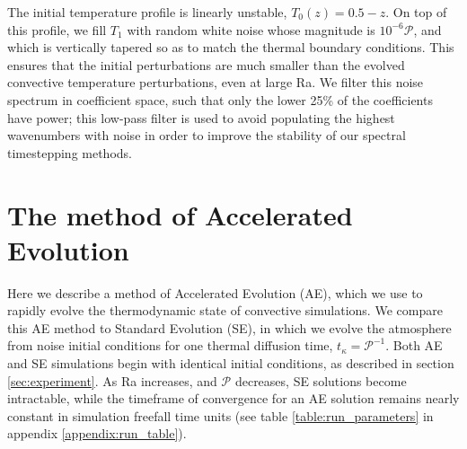\documentclass[aps, pre, onecolumn, nofootinbib, notitlepage, groupedaddress, amsfonts, amssymb, amsmath, longbibliography]{revtex4-1}
\begin{document}
The initial temperature profile is linearly unstable,
$T_0(z) = 0.5 - z$. On top of this profile, we fill $T_1$ with
random white noise whose magnitude is $10^{-6}\mathcal{P}$, and which is
vertically tapered so as to match the thermal boundary conditions.
This ensures that the initial perturbations are much smaller than the
evolved convective temperature perturbations, even at large Ra.
We filter this noise spectrum in coefficient space, 
such that only the lower 25\% of the coefficients
have power; this low-pass filter is used to avoid populating the
highest wavenumbers with noise in order to improve the stability of our
spectral timestepping methods.



\section{The method of Accelerated Evolution}
\label{sec:ae}
Here we describe a method of Accelerated Evolution (AE), which we use 
to rapidly evolve the thermodynamic state of convective simulations.  
We compare this AE method to Standard Evolution
(SE), in which we evolve the atmosphere from noise initial conditions
for one thermal diffusion time,
$t_\kappa = \mathcal{P}^{-1}$. Both AE and SE simulations begin with identical
initial conditions, as described in section \ref{sec:experiment}.
As Ra increases, and $\mathcal{P}$ decreases, SE solutions become intractable, 
while the timeframe of convergence for an AE solution remains nearly constant
in simulation freefall time units (see table \ref{table:run_parameters} in
appendix \ref{appendix:run_table}).
\end{document}
